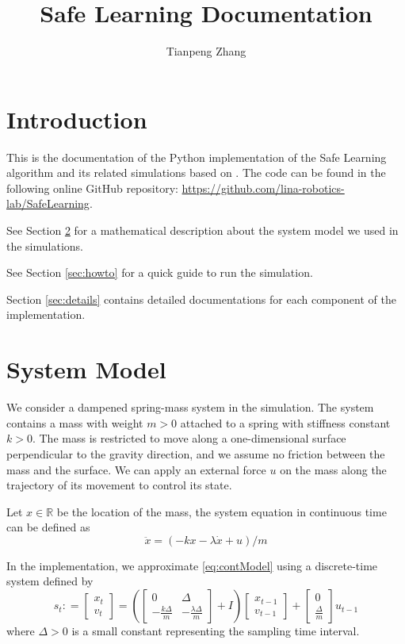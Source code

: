 \documentclass{article}
\theoremstyle{definition}
\theoremstyle{remark}
\begin{document}
	\title{\LARGE \bf Safe Learning Documentation}
	\author{Tianpeng Zhang}
	\maketitle
	
	\section{Introduction}
	This is the documentation of the Python implementation of the Safe Learning algorithm and its related simulations based on \cite{li2021safe}. The code can be found in the following online GitHub repository: \url{https://github.com/lina-robotics-lab/SafeLearning}. 
	
	See Section \ref{sec:system} for a mathematical description about the system model we used in the simulations.
	
	See Section \ref{sec:howto} for a quick guide to run the simulation.
	
	Section \ref{sec:details} contains detailed documentations for each component of the implementation.
	
	\section{System Model}\label{sec:system}
	We consider a dampened spring-mass system in the simulation. The system contains a mass with weight $m>0$ attached to a spring with stiffness constant $k>0$. The mass is restricted to move along a one-dimensional surface perpendicular to the gravity direction, and we assume no friction between the mass and the surface. We can apply an external force
	$u$ on the mass along the trajectory of its movement to control its state.
	
	Let $x\in \mathbb{R}$ be the location of the mass, the system equation in continuous time can be defined as 
	\begin{equation}\label{eq:contModel}
		\ddot{x} = (-k x - \lambda \dot{x} + u)/m
	\end{equation}

	In the implementation, we approximate \eqref{eq:contModel} using a discrete-time system defined by 
	\begin{equation}\label{eq:discModel}
		s_t : = \begin{bmatrix}
			x_t\\
			v_t
		\end{bmatrix} = (\begin{bmatrix}
		0& \Delta \\
		- \frac{k \Delta}{m}  & - \frac{\lambda \Delta}{m} 
	\end{bmatrix}+I)\begin{bmatrix}
	x_{t-1}\\
	v_{t-1}
	\end{bmatrix}  + \begin{bmatrix}
	0\\
	\frac{\Delta}{m}
	\end{bmatrix}u_{t-1}
	\end{equation}
where $\Delta>0$ is a small constant representing the sampling time interval.
\end{document}
